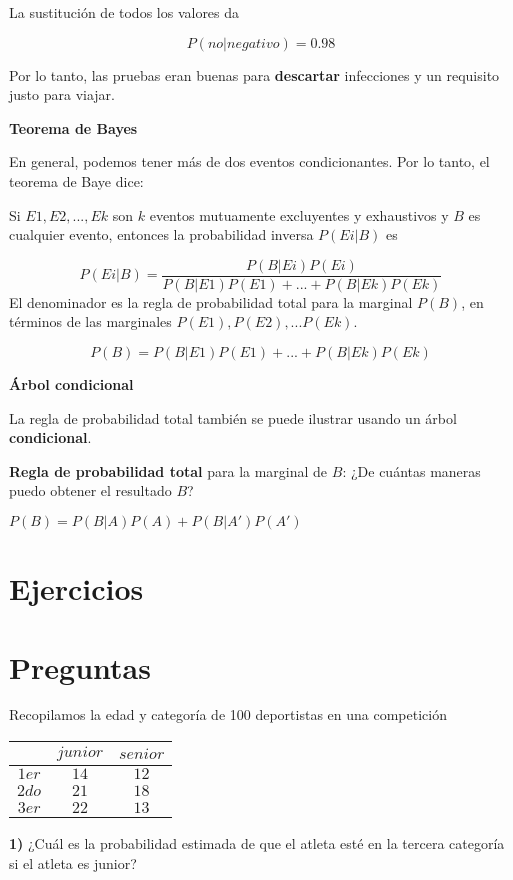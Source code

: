 \documentclass[
]{book}
\begin{document}
La sustitución de todos los valores da

\[P(no|negativo)=0.98\]

Por lo tanto, las pruebas eran buenas para \textbf{descartar} infecciones y un requisito justo para viajar.

\textbf{Teorema de Bayes}

En general, podemos tener más de dos eventos condicionantes. Por lo tanto, el teorema de Baye dice:

Si \(E1, E2, ..., Ek\) son \(k\) eventos mutuamente excluyentes y exhaustivos y \(B\) es cualquier evento, entonces la probabilidad inversa \(P(Ei|B)\) es

\[P(Ei|B)=\frac{P(B|Ei)P(Ei)}{P(B|E1)P(E1) +...+ P(B|Ek)P(Ek)} \]
El denominador es la regla de probabilidad total para la marginal \(P(B)\), en términos de las marginales \(P(E1), P(E2), ... P(Ek)\).

\[P(B)=P(B|E1)P(E1) +...+ P(B|Ek)P(Ek)\]

\textbf{Árbol condicional}

La regla de probabilidad total también se puede ilustrar usando un árbol \textbf{condicional}.

\textbf{Regla de probabilidad total} para la marginal de \(B\): ¿De cuántas maneras puedo obtener el resultado \(B\)?

\(P(B)=P(B|A)P(A)+P(B|A')P(A')\)

\hypertarget{ejercicios-2}{%
\section{Ejercicios}\label{ejercicios-2}}

\hypertarget{preguntas-2}{%
\section{Preguntas}\label{preguntas-2}}

Recopilamos la edad y categoría de 100 deportistas en una competición

\begin{longtable}[]{@{}ccc@{}}
\toprule
& \(junior\) & \(senior\) \\
\midrule
\endhead
\(1er\) & \(14\) & \(12\) \\
\(2do\) & \(21\) & \(18\) \\
\(3er\) & \(22\) & \(13\) \\
\bottomrule
\end{longtable}

\textbf{1)} ¿Cuál es la probabilidad estimada de que el atleta esté en la tercera categoría si el atleta es junior?
\end{document}
